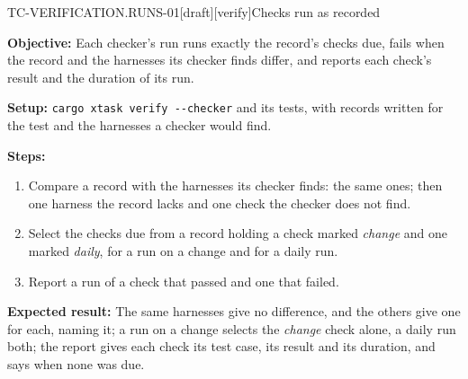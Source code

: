 \begin{requirement}{TC-VERIFICATION.RUNS-01}[draft][verify]{Checks run as recorded}


  \textbf{Objective:} Each checker's run runs exactly the record's checks
  due, fails when the record and the harnesses its checker finds differ,
  and reports each check's result and the duration of its run.

  \textbf{Setup:} \texttt{cargo xtask verify -{}-checker} and its tests,
  with records written for the test and the harnesses a checker would find.

  \textbf{Steps:}
  \begin{enumerate}
    \item Compare a record with the harnesses its checker finds: the same
      ones; then one harness the record lacks and one check the checker does
      not find.
    \item Select the checks due from a record holding a check marked
      \emph{change} and one marked \emph{daily}, for a run on a change and
      for a daily run.
    \item Report a run of a check that passed and one that failed.
  \end{enumerate}

  \textbf{Expected result:} The same harnesses give no difference, and the
  others give one for each, naming it; a run on a change selects the
  \emph{change} check alone, a daily run both; the report gives each check
  its test case, its result and its duration, and says when none was due.



\end{requirement}

